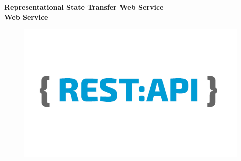 \documentclass[12pt,a4paper]{article}
\begin{document}
		\begin{center}
				{\Large \textbf{Representational State Transfer Web Service \\\vspace{0.3cm} Web Service}}\\\vspace{1cm}
		\end{center}
		\begin{center}
			\begin{figure}
				\includegraphics[width=\linewidth]{images/FrontPageTitle.png}
			\end{figure}
		\end{center}
\end{document}
